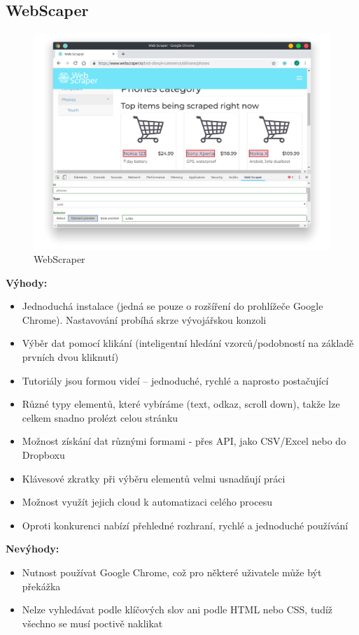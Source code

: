 \documentclass[thesis=B,czech]{FITthesis}[2012/06/26]
\begin{document}
\newpage
\subsection{WebScaper}
\begin{figure}[h]
	\includegraphics[width=\linewidth]{images/WebScraper.png}
	\caption{WebScraper}
	\label{fig:webScraper}
\end{figure}

\textbf{Výhody:}
\begin{itemize}
	\item Jednoduchá instalace (jedná se pouze o rozšíření do prohlížeče Google Chrome). Nastavování probíhá skrze vývojářskou konzoli
	\item Výběr dat pomocí klikání (inteligentní hledání vzorců/podobností na základě prvních dvou kliknutí)
	\item Tutoriály jsou formou videí -- jednoduché, rychlé a naprosto postačující
	\item Různé typy elementů, které vybíráme (text, odkaz, scroll down), takže lze celkem snadno prolézt celou stránku
	\item Možnost získání dat různými formami - přes API, jako CSV/Excel nebo do Dropboxu
	\item Klávesové zkratky při výběru elementů velmi usnad\v{n}ují práci
	\item Možnost využít jejich cloud k automatizaci celého procesu
	\item Oproti konkurenci nabízí přehledné rozhraní, rychlé a jednoduché používání
\end{itemize}

\textbf{Nevýhody:}
\begin{itemize}
	\item Nutnost používat Google Chrome, což pro některé uživatele může být překážka
	\item Nelze vyhledávat podle klíčových slov ani podle HTML nebo CSS, tudíž všechno se musí poctivě naklikat
\end{itemize}
\end{document}
